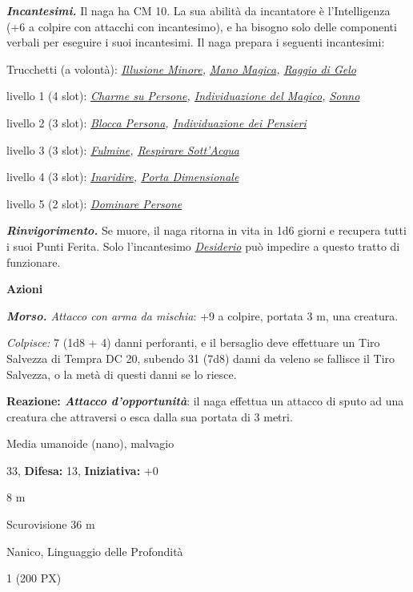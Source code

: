 \begin{multicols}{2}
{\emph{\textbf{Incantesimi.}} Il naga ha CM 10. La sua abilità da incantatore è l'Intelligenza (+6 a colpire con attacchi con incantesimo), e ha bisogno solo delle componenti verbali per eseguire i suoi incantesimi. Il naga prepara i seguenti incantesimi:

Trucchetti (a volontà): \emph{\hyperlink{Illusione Minore}{Illusione Minore}, \hyperlink{Mano Magica}{Mano Magica}, \hyperlink{Raggio di Gelo}{Raggio di Gelo}}

livello 1 (4 slot): \emph{\hyperlink{Charme su Persone}{Charme su Persone}, \hyperlink{Individuazione del Magico}{Individuazione del Magico}, \hyperlink{Sonno}{Sonno}}

livello 2 (3 slot): \emph{\hyperlink{Blocca Persona}{Blocca Persona}, \hyperlink{Individuazione dei Pensieri}{Individuazione dei Pensieri}}

livello 3 (3 slot): \emph{\hyperlink{Fulmine}{Fulmine}, \hyperlink{Respirare Sott'Acqua}{Respirare Sott'Acqua}}

livello 4 (3 slot): \emph{\hyperlink{Inaridire}{Inaridire}, \hyperlink{Porta Dimensionale}{Porta Dimensionale}}

livello 5 (2 slot): \emph{\hyperlink{Dominare Persone}{Dominare Persone}}

\emph{\textbf{Rinvigorimento.}} Se muore, il naga ritorna in vita in 1d6 giorni e recupera tutti i suoi Punti Ferita. Solo l'incantesimo \emph{\hyperlink{Desiderio}{Desiderio}} può impedire a questo tratto di funzionare.

\textbf{Azioni}

\emph{\textbf{Morso.} Attacco con arma da mischia}: +9 a colpire, portata 3 m, una creatura.

\emph{Colpisce:} 7 (1d8 + 4) danni perforanti, e il bersaglio deve effettuare un Tiro Salvezza di Tempra DC 20, subendo 31 (7d8) danni da veleno se fallisce il Tiro Salvezza, o la metà di questi danni se lo riesce.

\textbf{Reazione: \emph{Attacco d'opportunità}}: il naga effettua un attacco di sputo ad una creatura che attraversi o esca dalla sua portata di 3 metri.

\noindent
\begin{description}[noitemsep, topsep=0pt, parsep=0pt, partopsep=0pt, leftmargin=0cm, labelwidth=2.2cm]
	\item[\textbf{Taglia/Tipo:}] Media umanoide (nano), malvagio
	\item[\textbf{Caratt.:}] 
	\item[\textbf{Punti Ferita:}] 33,  \textbf{Difesa:} 13,  \textbf{Iniziativa:} +0
	\item[\textbf{Movimento:}] 8 m
	\item[\textbf{Tiri Salvez.:}] 
	\item[\textbf{Sensi:}] Scurovisione 36 m
	\item[\textbf{Linguaggi:}] Nanico, Linguaggio delle Profondità
	\item[\textbf{Sfida:}] 1 (200 PX)\smallskip
\end{description}

}
\end{multicols}
